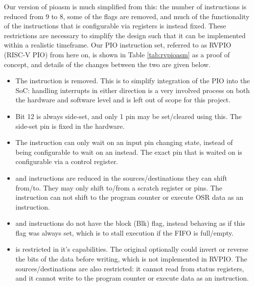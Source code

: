 Our version of pioasm is much simplified from this: the number of instructions is reduced from 9 to 8, some of the flags are removed, and much of the functionality of the instructions that is configurable via registers is instead fixed. These restrictions are necessary to simplify the design such that it can be implemented within a realistic timeframe. Our PIO instruction set, referred to as RVPIO (RISC-V PIO) from here on, is shown in Table \ref{tab:rvpioasm} as a proof of concept, and details of the changes between the two are given below.

\begin{itemize}
    \item The  instruction is removed. This is to simplify integration of the PIO into the SoC: handling interrupts in either direction is a very involved process on both the hardware and software level and is left out of scope for this project.
    \item Bit 12 is always side-set, and only 1 pin may be set/cleared using this. The side-set pin is fixed in the hardware.
    \item The  instruction can only wait on an input pin changing state, instead of being configurable to wait on an  instead. The exact pin that is waited on is configurable via a control register.
    \item {} and  instructions are reduced in the sources/destinations they can shift from/to. They may only shift to/from a scratch register or pins. The  instruction can not shift to the program counter or execute OSR data as an instruction.
    \item {} and  instructions do not have the block (Blk) flag, instead behaving as if this flag was always set, which is to stall execution if the FIFO is full/empty.
    \item {} is restricted in it's capabilities. The original optionally could invert or reverse the bits of the data before writing, which is not implemented in RVPIO. The sources/destinations are also restricted: it cannot read from status registers, and it cannot write to the program counter or execute data as an instruction.
\end{itemize}

